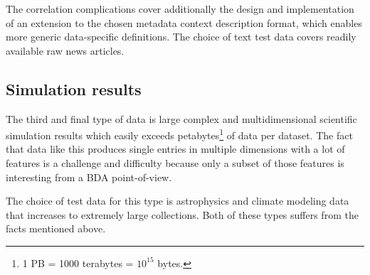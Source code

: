 The correlation complications cover additionally the design and implementation of an extension to the chosen metadata context description format, which enables more generic data-specific definitions. The choice of text test data covers \eg readily available raw news articles.

\subsection*{Simulation results}
The third and final type of data is large complex and multidimensional scientific simulation results which easily exceeds petabytes\footnote{1 PB =  1000 terabytes = $10^{15}$ bytes.} of data per dataset. The fact that data like this produces single entries in multiple dimensions with a lot of features is a challenge and difficulty because only a subset of those features is interesting from a BDA point-of-view.

The choice of test data for this type is astrophysics and climate modeling data that increases to extremely large collections. Both of these types suffers from the facts mentioned above.
